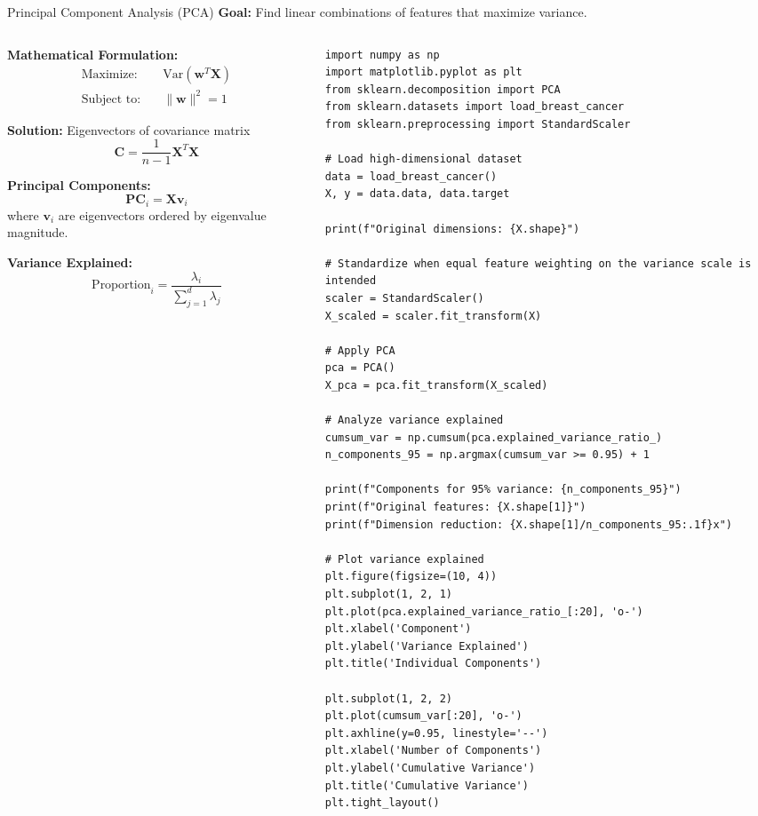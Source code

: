 \documentclass[aspectratio=169,11pt]{beamer}
\begin{document}
\begin{frame}[fragile]{Principal Component Analysis (PCA)}
\textbf{Goal:} Find linear combinations of features that maximize variance.

\begin{columns}
\begin{column}{0.5\textwidth}
\textbf{Mathematical Formulation:}
\begin{align}
\text{Maximize:} \quad &\text{Var}(\mathbf{w}^T \mathbf{X})\\
\text{Subject to:} \quad &\|\mathbf{w}\|^2 = 1
\end{align}

\textbf{Solution:} Eigenvectors of covariance matrix
\[\mathbf{C} = \frac{1}{n-1}\mathbf{X}^T\mathbf{X}\]

\textbf{Principal Components:}
\[\mathbf{PC}_i = \mathbf{X} \mathbf{v}_i\]
where $\mathbf{v}_i$ are eigenvectors ordered by eigenvalue magnitude.

\vspace{0.3cm}
\textbf{Variance Explained:}
\[\text{Proportion}_i = \frac{\lambda_i}{\sum_{j=1}^d \lambda_j}\]
\end{column}
\begin{column}{0.5\textwidth}
\begin{lstlisting}
import numpy as np
import matplotlib.pyplot as plt
from sklearn.decomposition import PCA
from sklearn.datasets import load_breast_cancer
from sklearn.preprocessing import StandardScaler

# Load high-dimensional dataset
data = load_breast_cancer()
X, y = data.data, data.target

print(f"Original dimensions: {X.shape}")

# Standardize when equal feature weighting on the variance scale is intended
scaler = StandardScaler()
X_scaled = scaler.fit_transform(X)

# Apply PCA
pca = PCA()
X_pca = pca.fit_transform(X_scaled)

# Analyze variance explained
cumsum_var = np.cumsum(pca.explained_variance_ratio_)
n_components_95 = np.argmax(cumsum_var >= 0.95) + 1

print(f"Components for 95% variance: {n_components_95}")
print(f"Original features: {X.shape[1]}")
print(f"Dimension reduction: {X.shape[1]/n_components_95:.1f}x")

# Plot variance explained
plt.figure(figsize=(10, 4))
plt.subplot(1, 2, 1)
plt.plot(pca.explained_variance_ratio_[:20], 'o-')
plt.xlabel('Component')
plt.ylabel('Variance Explained')
plt.title('Individual Components')

plt.subplot(1, 2, 2)
plt.plot(cumsum_var[:20], 'o-')
plt.axhline(y=0.95, linestyle='--')
plt.xlabel('Number of Components')
plt.ylabel('Cumulative Variance')
plt.title('Cumulative Variance')
plt.tight_layout()
\end{lstlisting}
\end{column}
\end{columns}
\end{frame}
\end{document}
